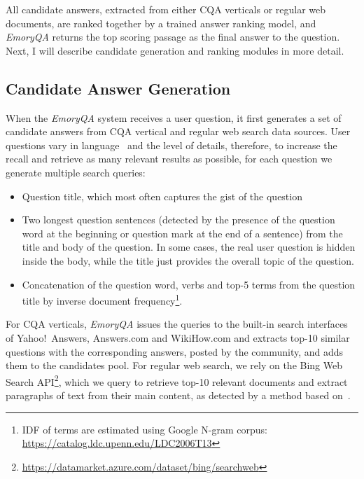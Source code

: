 All candidate answers, extracted from either CQA verticals or regular web documents, are ranked together by a trained answer ranking model, and \textit{EmoryQA} returns the top scoring passage as the final answer to the question.
Next, I will describe candidate generation and ranking modules in more detail.

\subsection{Candidate Answer Generation}
\label{section:non-factoid:system:candidates}

When the \textit{EmoryQA} system receives a user question, it first generates a set of candidate answers from CQA vertical and regular web search data sources.
User questions vary in language~\cite{AgichteinLG01} and the level of details, therefore, to increase the recall and retrieve as many relevant results as possible, for each question we generate multiple search queries:
\begin{itemize}[noitemsep]
\item Question title, which most often captures the gist of the question
\item Two longest question sentences (detected by the presence of the question word at the beginning or question mark at the end of a sentence) from the title and body of the question. In some cases, the real user question is hidden inside the body, while the title just provides the overall topic of the question.
\item Concatenation of the question word, verbs and top-5 terms from the question title by inverse document frequency\footnote{IDF of terms are estimated using Google N-gram corpus: \href{url}{https://catalog.ldc.upenn.edu/LDC2006T13}}.
\end{itemize}

For CQA verticals, \textit{EmoryQA} issues the queries to the built-in search interfaces of Yahoo!~Answers, Answers.com and WikiHow.com and extracts top-10 similar questions with the corresponding answers, posted by the community, and adds them to the candidates pool.
For regular web search, we rely on the Bing Web Search API\footnote{\href{url}{https://datamarket.azure.com/dataset/bing/searchweb}}, which we query to retrieve top-10 relevant documents and extract paragraphs of text from their main content, as detected by a method based on~\cite{Kohlschutter_2010}.

